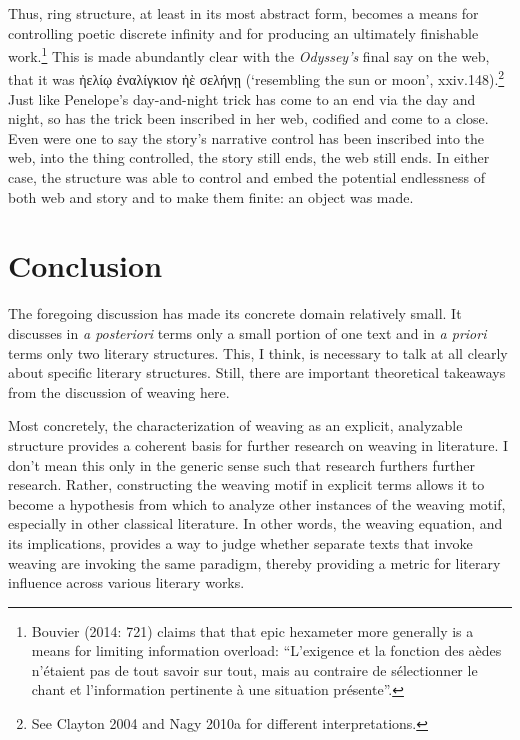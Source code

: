 \documentclass[12pt]{article}
\begin{document}
Thus, ring structure, at least in its most abstract form, becomes a means for controlling poetic discrete infinity and for producing an ultimately finishable work.\footnote{ Bouvier (2014: 721) claims that that epic hexameter more generally is a means for limiting information overload: ``L'exigence et la fonction des a\`{e}des n'\'{e}taient pas de tout savoir sur tout, mais au contraire de s\'{e}lectionner le chant et l'information pertinente \`{a} une situation pr\'{e}sente''.} This is made abundantly clear with the \textit{Odyssey's} final say on the web, that it was ἠελίῳ ἐναλίγκιον ἠὲ σελήνῃ (`resembling the sun or moon', xxiv.148).\footnote{ See Clayton 2004 and Nagy 2010a for different interpretations.} Just like Penelope's day-and-night trick has come to an end via the day and night, so has the trick been inscribed in her web, codified and come to a close. Even were one to say the story's narrative control has been inscribed into the web, into the thing controlled, the story still ends, the web still ends. In either case, the structure was able to control and embed the potential endlessness of both web and story and to make them finite: an object was made.


\section{Conclusion}

The foregoing discussion has made its concrete domain relatively small. It discusses in \textit{a posteriori} terms only a small portion of one text and in \textit{a priori} terms only two literary structures. This, I think, is necessary to talk at all clearly about specific literary structures. Still, there are important theoretical takeaways from the discussion of weaving here.

Most concretely, the characterization of weaving as an explicit, analyzable structure provides a coherent basis for further research on weaving in literature. I don't mean this only in the generic sense such that research furthers further research. Rather, constructing the weaving motif in explicit terms allows it to become a hypothesis from which to analyze other instances of the weaving motif, especially in other classical literature. In other words, the weaving equation, and its implications, provides a way to judge whether separate texts that invoke weaving are invoking the same paradigm, thereby providing a metric for literary influence across various literary works.
\end{document}
